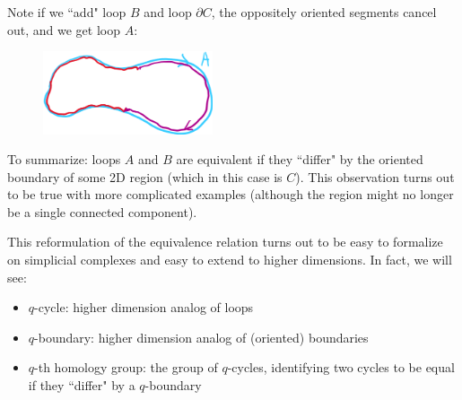 Note if we ``add" loop $B$ and loop $\partial C$, the oppositely oriented segments cancel out, and we get loop $A$:
\begin{figure}[H]
    \includegraphics[width=5cm]{figures/intuition-4}
    \centering
\end{figure}
To summarize: loops $A$ and $B$ are equivalent if they ``differ" by the oriented boundary of some 2D region (which in this case is $C$). This observation turns out to be true with more complicated examples (although the region might no longer be a single connected component).

This reformulation of the equivalence relation turns out to be easy to formalize on simplicial complexes and easy to extend to higher dimensions. In fact, we will see:
\begin{itemize}
    \item $q$-cycle: higher dimension analog of loops
    \item $q$-boundary: higher dimension analog of (oriented) boundaries
    \item $q$-th homology group: the group of $q$-cycles, identifying two cycles to be equal if they ``differ" by a $q$-boundary
\end{itemize}
